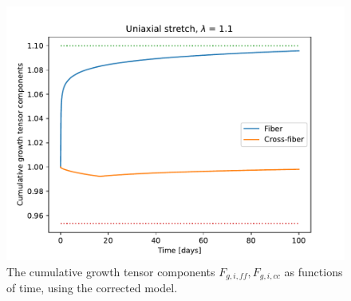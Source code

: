 \documentclass[a4paper,10pt]{article}
\begin{document}
\begin{figure}
  \centerline{
    \includegraphics{figs/cumulative_growth}
  }
\caption{The cumulative growth tensor components $F_{g,i,ff}, F_{g,i,cc}$ as functions of time, using the corrected model.}
\label{fig:cum_growth_tensors_old}
\end{figure}
\end{document}

